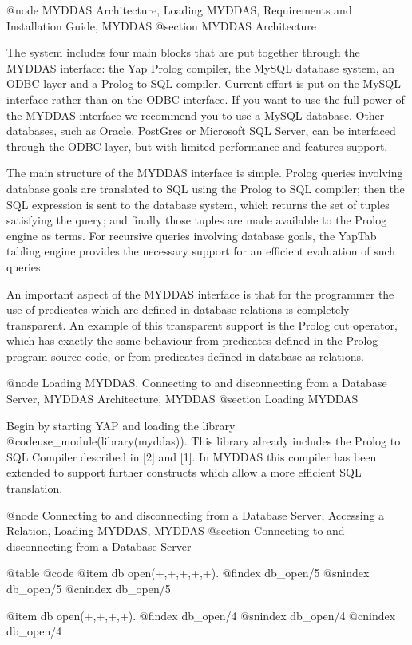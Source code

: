 @node MYDDAS Architecture, Loading MYDDAS, Requirements and Installation Guide, MYDDAS
@section MYDDAS Architecture

The system includes four main blocks that are put together through the
MYDDAS interface: the Yap Prolog compiler, the MySQL database system, an
ODBC layer and a Prolog to SQL compiler. Current effort is put on the
MySQL interface rather than on the ODBC interface. If you want to use
the full power of the MYDDAS interface we recommend you to use a MySQL
database. Other databases, such as Oracle, PostGres or Microsoft SQL
Server, can be interfaced through the ODBC layer, but with limited
performance and features support.  

The main structure of the MYDDAS interface is simple. Prolog queries
involving database goals are translated to SQL using the Prolog to SQL
compiler; then the SQL expression is sent to the database system, which
returns the set of tuples satisfying the query; and finally those tuples
are made available to the Prolog engine as terms. For recursive queries
involving database goals, the YapTab tabling engine provides the
necessary support for an efficient evaluation of such queries.

An important aspect of the MYDDAS interface is that for the programmer
the use of predicates which are defined in database relations is
completely transparent. An example of this transparent support is the
Prolog cut operator, which has exactly the same behaviour from
predicates defined in the Prolog program source code, or from predicates
defined in database as relations.

@node Loading MYDDAS, Connecting to and disconnecting from a Database Server, MYDDAS Architecture, MYDDAS 
@section Loading MYDDAS

Begin by starting YAP and loading the library
@code{use_module(library(myddas))}.  This library already includes the
Prolog to SQL Compiler described in [2] and [1]. In MYDDAS this compiler
has been extended to support further constructs which allow a more
efficient SQL translation.  

@node Connecting to and disconnecting from a Database Server, Accessing a Relation, Loading MYDDAS, MYDDAS
@section Connecting to and disconnecting from a Database Server


@table @code
@item db open(+,+,+,+,+). 
@findex db_open/5
@snindex db_open/5
@cnindex db_open/5

@item db open(+,+,+,+). 
@findex db_open/4
@snindex db_open/4
@cnindex db_open/4

